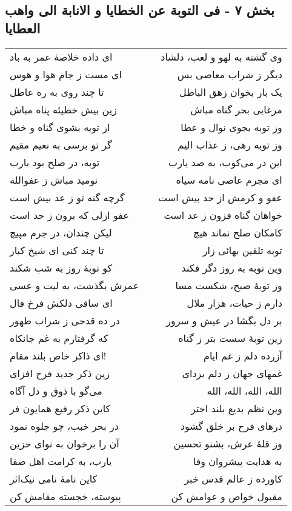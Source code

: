 \begin{center}
\section*{بخش ۷ - فی التوبة عن الخطایا و الانابة الی واهب العطایا}
\label{sec:007}
\begin{longtable}{l p{0.5cm} r}
ای داده خلاصهٔ عمر به باد
&&
وی گشته به لهو و لعب، دلشاد
\\
ای مست ز جام هوا و هوس
&&
دیگر ز شراب معاصی بس
\\
تا چند روی به ره عاطل
&&
یک بار بخوان زهق الباطل
\\
زین بیش خطیئه پناه مباش
&&
مرغابی بحر گناه مباش
\\
از توبه بشوی گناه و خطا
&&
وز توبه بجوی نوال و عطا
\\
گر تو برسی به نعیم مقیم
&&
وز توبه رهی، ز عذاب الیم
\\
توبه، در صلح بود بارب
&&
این در می‌کوب، به صد یارب
\\
نومید مباش ز عفوالله
&&
ای مجرم عاصی نامه سیاه
\\
گرچه گنه تو ز عد بیش است
&&
عفو و کرمش از حد بیش است
\\
عفو ازلی که برون ز حد است
&&
خواهان گناه فزون ز عد است
\\
لیکن چندان، در جرم مپیچ
&&
کامکان صلح نماند هیچ
\\
تا چند کنی ای شیخ کبار
&&
توبه تلقین بهائی زار
\\
کو توبهٔ روز به شب شکند
&&
وین توبه به روز دگر فکند
\\
عمرش بگذشت، به لیت و عسی
&&
وز توبهٔ صبح، شکست مسا
\\
ای ساقی دلکش فرخ فال
&&
دارم ز حیات، هزار ملال
\\
در ده قدحی ز شراب طهور
&&
بر دل بگشا در عیش و سرور
\\
که گرفتارم به غم جانکاه
&&
زین توبهٔ سست بتر ز گناه
\\
ای ذاکر خاص بلند مقام!
&&
آزرده دلم ز غم ایام
\\
زین ذکر جدید فرح افزای
&&
غمهای جهان ز دلم بزدای
\\
می‌گو با ذوق و دل آگاه
&&
الله، الله، الله، الله
\\
کاین ذکر رفیع همایون فر
&&
وین نظم بدیع بلند اختر
\\
در بحر خبب، چو جلوه نمود
&&
درهای فرح بر خلق گشود
\\
آن را برخوان به نوای حزین
&&
وز قلهٔ عرش، بشنو تحسین
\\
یارب، به کرامت اهل صفا
&&
به هدایت پیشروان وفا
\\
کاین نامهٔ نامی نیک‌اثر
&&
کاورده ز عالم قدس خبر
\\
پیوسته، خجسته مقامش کن
&&
مقبول خواص و عوامش کن
\\
\end{longtable}
\end{center}
